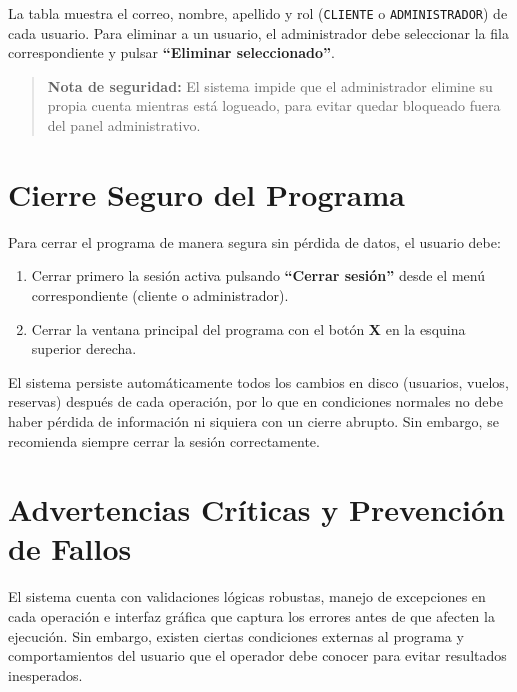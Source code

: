\documentclass[12pt, letterpaper]{article}
\begin{document}
	La tabla muestra el correo, nombre, apellido y rol (\texttt{CLIENTE} o \texttt{ADMINISTRADOR}) de cada usuario. Para eliminar a un usuario, el administrador debe seleccionar la fila correspondiente y pulsar \textbf{``Eliminar seleccionado''}.
	
	\begin{quote}
		\textbf{Nota de seguridad:} El sistema impide que el administrador elimine su propia cuenta mientras está logueado, para evitar quedar bloqueado fuera del panel administrativo.
	\end{quote}
	
	\section{Cierre Seguro del Programa}
	Para cerrar el programa de manera segura sin pérdida de datos, el usuario debe:
	\begin{enumerate}
		\item Cerrar primero la sesión activa pulsando \textbf{``Cerrar sesión''} desde el menú correspondiente (cliente o administrador).
		\item Cerrar la ventana principal del programa con el botón \textbf{X} en la esquina superior derecha.
	\end{enumerate}
	El sistema persiste automáticamente todos los cambios en disco (usuarios, vuelos, reservas) después de cada operación, por lo que en condiciones normales no debe haber pérdida de información ni siquiera con un cierre abrupto. Sin embargo, se recomienda siempre cerrar la sesión correctamente.
	
\section{Advertencias Críticas y Prevención de Fallos}
El sistema cuenta con validaciones lógicas robustas, manejo de excepciones en cada operación e interfaz gráfica que captura los errores antes de que afecten la ejecución. Sin embargo, existen ciertas condiciones externas al programa y comportamientos del usuario que el operador debe conocer para evitar resultados inesperados.
\end{document}
